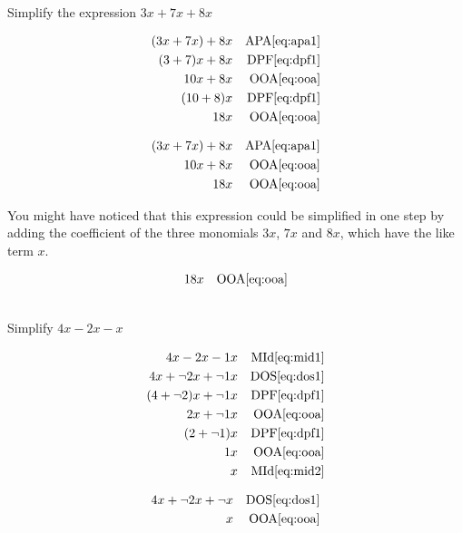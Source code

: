 \begin{example}[id:20141121-184652] \label{20141121-184652} \hfill \\

Simplify the expression $3x+7x+8x$

\soln
\solnsteps
\begin{align*}
(3x+7x)+8x && \text{APA} \eqref{eq:apa1} \\
(3+7)x+8x && \text{DPF} \eqref{eq:dpf1} \\
10x+8x && \text{OOA} \eqref{eq:ooa} \\
(10+8)x && \text{DPF} \eqref{eq:dpf1} \\
18x && \text{OOA} \eqref{eq:ooa} 
\end{align*}

\soln

\lesssteps
\begin{align*}
(3x+7x)+8x && \text{APA} \eqref{eq:apa1} \\
10x+8x && \text{OOA} \eqref{eq:ooa} \\
18x && \text{OOA} \eqref{eq:ooa} 
\end{align*}

You might have noticed that this expression could be simplified in one step by adding the coefficient of the three monomials $3x$, $7x$ and $8x$, which have the like term $x$.\\

\soln

\lesssteps
\begin{align*}
18x && \text{OOA} \eqref{eq:ooa} 
\end{align*}

\end{example}

\begin{example}[id:20141106-152020] \label{20141106-152020}  \hfill \\

Simplify $4x-2x-x$

\soln

\solnsteps
\begin{align*}
4x-2x-1x && \text{MId} \eqref{eq:mid1} \\
4x+\neg 2x + \neg 1 x && \text{DOS} \eqref{eq:dos1} \\
(4+\neg 2)x + \neg 1x && \text{DPF} \eqref{eq:dpf1} \\ 
2x+\neg 1x && \text{OOA} \eqref{eq:ooa} \\
(2+\neg 1)x && \text{DPF} \eqref{eq:dpf1} \\ 
1x && \text{OOA} \eqref{eq:ooa} \\
x && \text{MId} \eqref{eq:mid2}  
\end{align*}

\soln

\lesssteps
\begin{align*}
4x + \neg 2x + \neg x && \text{DOS} \eqref{eq:dos1} \\
x && \text{OOA} \eqref{eq:ooa} 
\end{align*}
\end{example}

